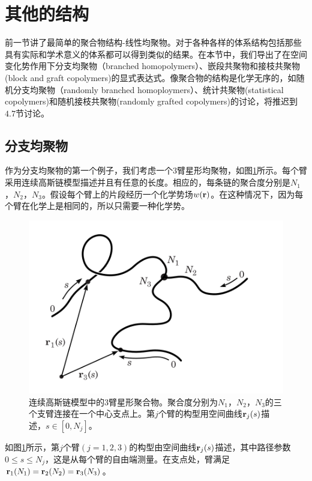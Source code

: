 \section{其他的结构}

前一节讲了最简单的聚合物结构-线性均聚物。对于各种各样的体系结构包括那些具有实际和学术意义的体系都可以得到类似的结果。在本节中，我们导出了在空间变化势作用下分支均聚物（branched homopolymers）、嵌段共聚物和接枝共聚物(block and graft copolymers)的显式表达式。像聚合物的结构是化学无序的，如随机分支均聚物（randomly branched homoploymers）、统计共聚物(statistical copolymers)和随机接枝共聚物(randomly grafted copolymers)的讨论，将推迟到$4.7$节讨论。
\subsection{分支均聚物}
作为分支均聚物的第一个例子，我们考虑一个$3$臂星形均聚物，如图\ref{三臂星形均聚物}所示。每个臂采用连续高斯链模型描述并且有任意的长度。相应的，每条链的聚合度分别是$N_1$，$N_2$，$N_3$。假设每个臂上的片段经历一个化学势场$w (\mathbf{r})$。在这种情况下，因为每个臂在化学上是相同的，所以只需要一种化学势。
\begin{figure}[H]
\centering
\includegraphics[scale=0.7]{Contents/chapter3/figures/34.png}
\caption{连续高斯链模型中的$3$臂星形聚合物。聚合度分别为$N_1$，$N_2$，$N_3$的三个支臂连接在一个中心支点上。第$j$个臂的构型用空间曲线$\mathbf{r}_j(s)$描述，$s\in [0,N_j]$。}
\label{三臂星形均聚物}
\end{figure}

如图\ref{三臂星形均聚物}所示，第$j$个臂$(j=1,2,3)$的构型由空间曲线$\mathbf{r}_j(s)$描述，其中路径参数$0\leq s\leq N_j$，这是从每个臂的自由端测量。在支点处，臂满足$\mathbf{r}_1(N_1)=\mathbf{r}_2(N_2)=\mathbf{r}_3(N_3)$。


